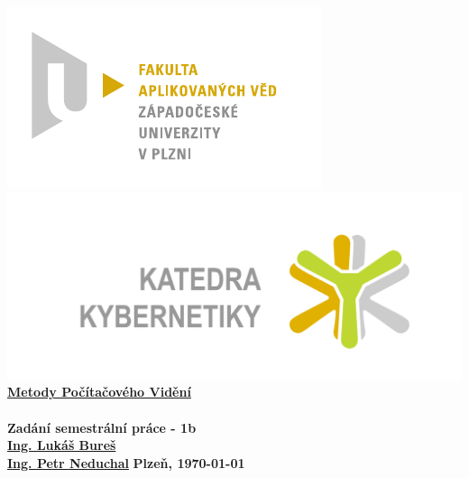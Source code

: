 \documentclass[12pt, a4paper]{article}
\newcommand{\cisloZadani}{Zadání semestrální práce - 1b}
\begin{document}
 









 
\begin{titlepage}
\begin{center}
	\includegraphics[trim = 0.6cm 0.5cm 0.9cm 0.5cm, scale=1]{./FAV_logo_cz.pdf}
	\hspace*{\fill}
	\includegraphics[trim = 3.5cm 1.5cm 2.6cm 2cm, scale=0.295]{./KKY_logo_cz.pdf}\\
	\vspace*{\fill}
	\textbf{\Huge{\href{http://www.kky.zcu.cz/cs/courses/mpv}{Metody Počítačového Vidění} \\ ~ \\ \cisloZadani}}\\
	\vspace*{\fill}
	\textbf{\large{\href{mailto:LBures@kky.zcu.cz}{Ing. Lukáš Bureš}}} \hspace*{\fill} \\
	\textbf{\large{\href{mailto:neduchal@kky.zcu.cz}{Ing. Petr Neduchal}}} \hfill \textbf{\large{Plzeň, \today}}
\end{center}
\end{titlepage}




\end{document}

